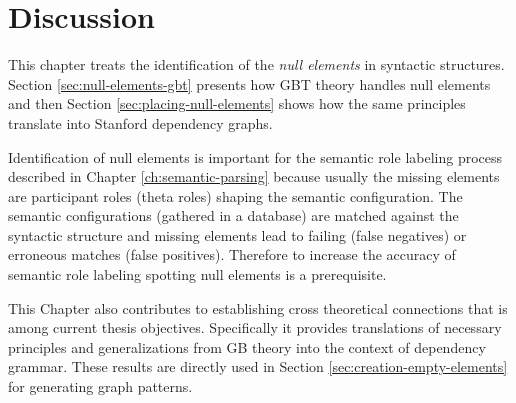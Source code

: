 \section{Discussion}
This chapter treats the identification of the \textit{null elements} in syntactic structures. Section \ref{sec:null-elements-gbt} presents how GBT theory handles null elements and then Section \ref{sec:placing-null-elements} shows how the same principles translate into Stanford dependency graphs.  

Identification of null elements is important for the semantic role labeling process described in Chapter \ref{ch:semantic-parsing} because usually the missing elements are participant roles (theta roles) shaping the semantic configuration. The semantic configurations (gathered in a database) are matched against the syntactic structure and missing elements lead to failing (false negatives) or erroneous matches (false positives). Therefore to increase the accuracy of semantic role labeling spotting null elements is a prerequisite.  

This Chapter also contributes to establishing cross theoretical connections that is among current thesis objectives. Specifically it provides translations of necessary principles and generalizations from GB theory into the context of dependency grammar. These results are directly used in Section \ref{sec:creation-empty-elements} for generating graph patterns.